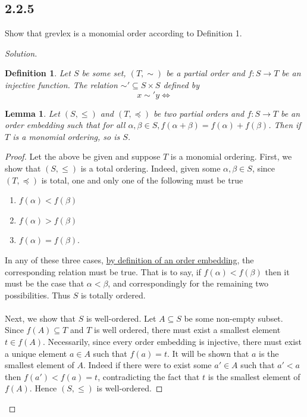 \documentclass[]{article}
\newtheorem{lemma}{Lemma}
\newtheorem{definition}{Definition}
\newcommand\<{\langle}
\renewcommand\>{\rangle}
\newenvironment{solution}
{
	\begin{proof}[Solution] \text{ }
		\\
	}
	{
	\end{proof}
}
\begin{document}
\subsection*{2.2.5} Show that grevlex is a monomial order according to Definition 1.
\begin{solution}
	\begin{definition}
		Let $S$ be some set, $(T, \sim)$ be a partial order and $f : S \to T$ be an injective function. The relation $\sim' \subseteq S \times S$ defined by
		$$
			x \sim' y \iff 
		$$
	\end{definition}
	\begin{lemma}
		Let $\left(S, \leq\right)$ and $\left(T, \preceq\right)$ be two partial orders and $f : S \to T$ be an order embedding such that for all $\alpha, \beta \in S, f(\alpha + \beta) = f(\alpha) + f(\beta)$. Then if $T$ is a monomial ordering, so is $S$.
	\end{lemma}
	\begin{proof}
		Let the above be given and suppose $T$ is a monomial ordering. First, we show that $\left(S, \leq\right)$ is a total ordering. Indeed, given some $\alpha, \beta \in S$, since $\left(T, \preceq\right)$ is total, one and only one of the following must be true
		\begin{enumerate}
			\item $f(\alpha) < f(\beta)$
			\item $f(\alpha) > f(\beta)$
			\item $f(\alpha) = f(\beta)$.
		\end{enumerate}
		In any of these three cases, \href{https://en.wikipedia.org/wiki/Order_embedding}{by definition of an order embedding}, the corresponding relation must be true. That is to say, if $f(\alpha) < f(\beta)$ then it must be the case that $\alpha < \beta$, and correspondingly for the remaining two possibilities. Thus $S$ is totally ordered.
		\\
		\\
		Next, we show that $S$ is well-ordered. Let $A \subseteq S$ be some non-empty subset. Since $f(A) \subseteq T$ and $T$ is well ordered, there must exist a smallest element $t \in f(A)$. Necessarily, since every order embedding is injective, there must exist a unique element $a \in A$ such that $f(a) = t$. It will be shown that $a$ is the smallest element of $A$. Indeed if there were to exist some $a' \in A$ such that $a' < a$ then $f(a') < f(a) = t$, contradicting the fact that $t$ is the smallest element of $f(A)$. Hence $\left(S, \leq\right)$ is well-ordered.

\end{proof}
\end{solution}
\end{document}

